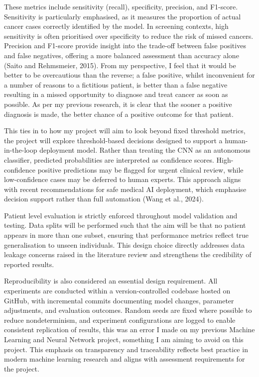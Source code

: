 These metrics include sensitivity (recall), specificity, precision, and F1-score. Sensitivity is particularly emphasised, as it measures the proportion of actual cancer cases correctly identified by the model. In screening contexts, high sensitivity is often prioritised over specificity to reduce the risk of missed cancers. Precision and F1-score provide insight into the trade-off between false positives and false negatives, offering a more balanced assessment than accuracy alone (Saito and Rehmsmeier, 2015). From my perspective, I feel that it would be better to be overcautious than the reverse; a false positive, whilst inconvenient for a number of reasons to a fictitious patient, is better than a false negative resulting in a missed opportunity to diagnose and treat cancer as soon as possible. As per my previous research, it is clear that the sooner a positive diagnosis is made, the better chance of a positive outcome for that patient.

This ties in to how my project will aim to look beyond fixed threshold metrics, the project will explore threshold-based decisions designed to support a human-in-the-loop deployment model. Rather than treating the CNN as an autonomous classifier, predicted probabilities are interpreted as confidence scores. High-confidence positive predictions may be flagged for urgent clinical review, while low-confidence cases may be deferred to human experts. This approach aligns with recent recommendations for safe medical AI deployment, which emphasise decision support rather than full automation (Wang et al., 2024).

Patient level evaluation is strictly enforced throughout model validation and testing. Data splits will be performed such that the aim will be that no patient appears in more than one subset, ensuring that performance metrics reflect true generalisation to unseen individuals. This design choice directly addresses data leakage concerns raised in the literature review and strengthens the credibility of reported results.

Reproducibility is also considered an essential design requirement. All experiments are conducted within a version-controlled codebase hosted on GitHub, with incremental commits documenting model changes, parameter adjustments, and evaluation outcomes. Random seeds are fixed where possible to reduce nondeterminism, and experiment configurations are logged to enable consistent replication of results, this was an error I made on my previous Machine Learning and Neural Network project, something I am aiming to avoid on this project. This emphasis on transparency and traceability reflects best practice in modern machine learning research and aligns with assessment requirements for the project. 

